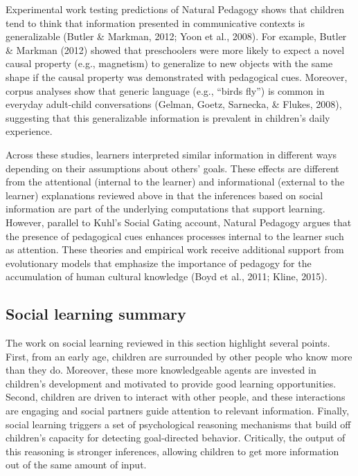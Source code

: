 \documentclass[oneside]{report}
\begin{document}
Experimental work testing predictions of Natural Pedagogy shows that
children tend to think that information presented in communicative
contexts is generalizable (Butler \& Markman, 2012; Yoon et al., 2008).
For example, Butler \& Markman (2012) showed that preschoolers were more
likely to expect a novel causal property (e.g., magnetism) to generalize
to new objects with the same shape if the causal property was
demonstrated with pedagogical cues. Moreover, corpus analyses show that
generic language (e.g., ``birds fly'') is common in everyday adult-child
conversations (Gelman, Goetz, Sarnecka, \& Flukes, 2008), suggesting
that this generalizable information is prevalent in children's daily
experience.

Across these studies, learners interpreted similar information in
different ways depending on their assumptions about others' goals. These
effects are different from the attentional (internal to the learner) and
informational (external to the learner) explanations reviewed above in
that the inferences based on social information are part of the
underlying computations that support learning. However, parallel to
Kuhl's Social Gating account, Natural Pedagogy argues that the presence
of pedagogical cues enhances processes internal to the learner such as
attention. These theories and empirical work receive additional support
from evolutionary models that emphasize the importance of pedagogy for
the accumulation of human cultural knowledge (Boyd et al., 2011; Kline,
2015).

\hypertarget{social-learning-summary}{%
\subsection{Social learning summary}\label{social-learning-summary}}

The work on social learning reviewed in this section highlight several
points. First, from an early age, children are surrounded by other
people who know more than they do. Moreover, these more knowledgeable
agents are invested in children's development and motivated to provide
good learning opportunities. Second, children are driven to interact
with other people, and these interactions are engaging and social
partners guide attention to relevant information. Finally, social
learning triggers a set of psychological reasoning mechanisms that build
off children's capacity for detecting goal-directed behavior.
Critically, the output of this reasoning is stronger inferences,
allowing children to get more information out of the same amount of
input.
\end{document}
